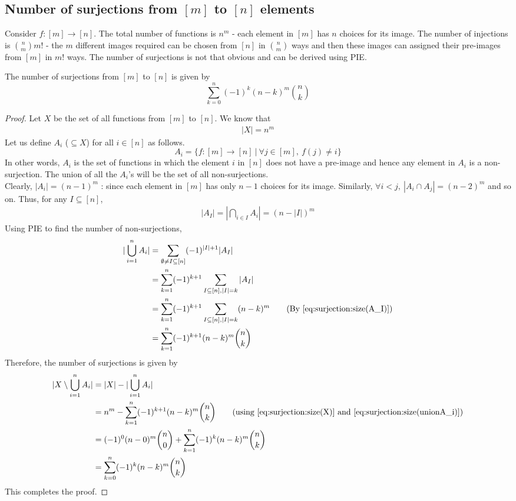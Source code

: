 \subsection{Number of surjections from $[m]$ to $[n]$ elements} \label{subsec:surjections application}
Consider $f : [m] \rightarrow [n]$. The total number of functions is $n^m$ - each element in $[m]$ has $n$ choices for its image. The number of injections is ${n \choose m}m!$ - the $m$ different images required can be chosen from $[n]$ in ${n \choose m}$ ways and then these images can assigned their pre-images from $[m]$ in $m!$ ways. The number of surjections is not that obvious and can be derived using PIE.\\
\begin{theorem}
The number of surjections from $[m]$ to $[n]$ is given by
$$\sum_{k=0}^{n} (-1)^k (n-k)^m {n \choose k}$$
\end{theorem}
\begin{proof}
Let $X$ be the set of all functions from $[m]$ to $[n]$. We know that
\begin{align}
    |X| = n^m \label{eq:surjection:size(X)}
\end{align}
Let us define $A_i$ ($\subseteq X$) for all $i\in[n]$ as follows.
$$A_i = \{f : [m] \rightarrow [n] ~|~ \forall j \in [m],~ f(j) \neq i\} $$
In other words, $A_i$ is the set of functions in which the element $i$ in $[n]$  does not have a pre-image and hence any element in $A_i$ is a non-surjection. The union of all the $A_i$'s will be the set of all non-surjections.\\
Clearly, $|A_i| = (n-1)^m$ : since each element in $[m]$ has only $n-1$ choices for its image. Similarly, $\forall i < j, ~|A_i\cap A_j| = (n-2)^m$ and so on. Thus, for any $I \subseteq [n]$,
\begin{align}
|A_I| = |\bigcap_{i \in I} A_i| = (n-|I|)^m \label{eq:surjection:size(A_I)}
\end{align}
Using PIE to find the number of non-surjections, 
\begin{align}
|\bigcup_{i=1}^{n} A_i| &= \sum_{\emptyset \neq I \subseteq [n]} (-1)^{|I| +1} |A_I|\nonumber\\
&= \sum_{k=1}^{n} (-1)^{k+1} \sum_{I \subseteq [n], |I| = k} |A_I|\nonumber\\
&= \sum_{k=1}^{n} (-1)^{k+1} \sum_{I \subseteq [n], |I| = k} (n-k)^m \nonumber\tag{By \ref{eq:surjection:size(A_I)}}\\
&= \sum_{k=1}^{n} (-1)^{k+1} (n-k)^m {n \choose k} \label{eq:surjection:size(unionA_i)}
\end{align}
Therefore, the number of surjections is given by
\begin{align*}
|X \setminus \bigcup_{i=1}^{n} A_i| &= |X| - |\bigcup_{i=1}^{n} A_i|\\
&= n^m - \sum_{k=1}^{n} (-1)^{k+1} (n-k)^m {n \choose k} \tag{using \ref{eq:surjection:size(X)} and \ref{eq:surjection:size(unionA_i)}}\\
&= (-1)^0 (n-0)^m {n \choose 0}+ \sum_{k=1}^{n} (-1)^{k} (n-k)^m {n \choose k}\\
&= \sum_{k=0}^{n} (-1)^{k} (n-k)^m {n \choose k}
\end{align*}
This completes the proof.
\end{proof}
\noindent\\
